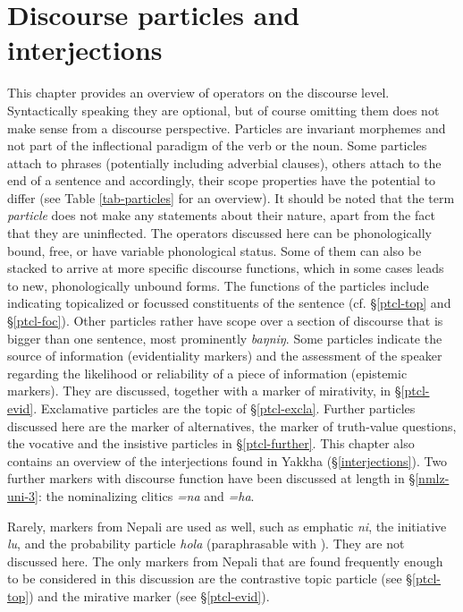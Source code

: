 ﻿\chapter{Discourse particles and interjections}\label{particles}

This chapter provides an overview of operators on the discourse level. Syntactically speaking they are optional, but of course omitting them does not make sense from a discourse perspective. Particles are invariant morphemes and not part of the inflectional paradigm of the verb or the noun. Some particles attach to phrases (potentially including adverbial clauses), others attach to the end of a sentence and accordingly, their scope properties have the potential to differ (see Table \ref{tab-particles} for an overview). It should be noted that the term \emph{particle} does not make any statements about their nature, apart from the fact that they are uninflected. The operators discussed here can be phonologically bound,  free, or have  variable phonological status. Some of them can also  be stacked to arrive at more specific discourse functions, which in some cases leads to new, phonologically unbound forms. 
The functions of the particles include indicating topicalized or focussed constituents of the sentence (cf. §\ref{ptcl-top} and §\ref{ptcl-foc}). Other particles rather have scope over a section of discourse that is bigger than one sentence, most prominently \emph{baŋniŋ}. Some particles indicate the source of information (evidentiality markers) and the assessment of the speaker regarding the likelihood or reliability of a piece of information (epistemic markers). They are discussed, together with a marker of mirativity, in §\ref{ptcl-evid}. Exclamative particles are the topic of §\ref{ptcl-excla}. Further particles discussed here are the marker of alternatives, the marker of truth-value questions, the vocative and the insistive particles in §\ref{ptcl-further}.  This chapter also contains an overview of the interjections found in Yakkha (§\ref{interjections}). Two further markers with discourse function have been discussed at length in §\ref{nmlz-uni-3}: the nominalizing clitics \emph{=na} and \emph{=ha}. 

Rarely, markers from Nepali are used as well, such as emphatic \emph{ni}, the initiative \emph{lu}, and the probability particle \emph{hola} (paraphrasable with ). They are not discussed here. The only markers from Nepali that are found frequently enough to be considered in this discussion are the contrastive topic particle (see §\ref{ptcl-top}) and the mirative marker  (see §\ref{ptcl-evid}).

